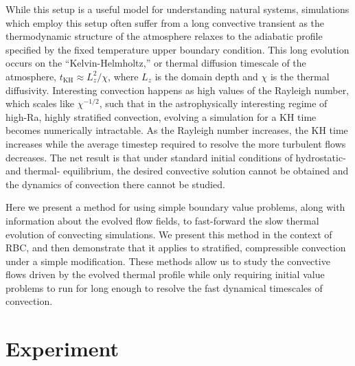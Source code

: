 \documentclass[aps, pre, onecolumn, nofootinbib, notitlepage, groupedaddress, amsfonts, amssymb, amsmath, longbibliography]{revtex4-1}
\begin{document}
While this setup is a useful model for understanding natural
systems, simulations which employ this setup often suffer from a long convective transient as the thermodynamic structure
of the atmosphere relaxes to the adiabatic profile specified by the fixed temperature upper boundary condition.
This long evolution occurs on the ``Kelvin-Helmholtz,'' or thermal diffusion timescale of the atmosphere, 
$t_{\text{KH}} \approx L_z^2 / \chi$, where $L_z$ is the domain depth and $\chi$ is the thermal diffusivity.
Interesting convection happens as high values of the Rayleigh number, which scales like $\chi^{-1/2}$, such that
in the astrophysically interesting regime of high-Ra, highly stratified convection, evolving a simulation for a
KH time becomes numerically intractable.  As the Rayleigh number increases, the KH time increases while the average
timestep required to resolve the more turbulent flows decreases.  The net result is that under standard initial conditions
of hydrostatic- and thermal- equilibrium, the desired convective solution cannot be obtained and the dynamics of convection
there cannot be studied.

Here we present a method for using simple boundary value problems, along with information about the evolved flow fields,
to fast-forward the slow thermal evolution of convecting simulations.  We present this method in the context of RBC, and
then demonstrate that it applies to stratified, compressible convection under a simple modification.  These methods allow
us to study the convective flows driven by the evolved thermal profile while only requiring initial value problems to run
for long enough to resolve the fast dynamical timescales of convection.


\section{Experiment} 
\label{sec:experiment}
\end{document}

